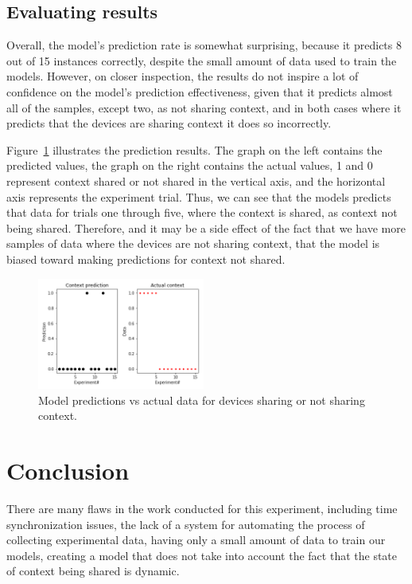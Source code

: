 \documentclass[journal]{IEEEtranTIE}
\begin{document}
\subsection{Evaluating results}

Overall, the model's prediction rate is somewhat surprising, because it predicts
8 out of 15 instances correctly, despite the small amount of data used to train
the models. However, on closer inspection, the results do not inspire a lot of
confidence on the model's prediction effectiveness, given that it predicts
almost all of the samples, except two, as not sharing context, and in both cases
where it predicts that the devices are sharing context it does so incorrectly.

Figure~\ref{fig:model_eval} illustrates the prediction results. The graph on the
left contains the predicted values, the graph on the right contains the actual
values, 1 and 0 represent context shared or not shared in the vertical axis, and
the horizontal axis represents the experiment trial. Thus, we can see that the
models predicts that data for trials one through five, where the context is
shared, as context not being shared. Therefore, and it may be a side effect of
the fact that we have more samples of data where the devices are not sharing
context, that the model is biased toward making predictions for context not
shared.

\begin{figure}[!t]\centering
	\includegraphics[width=5.5cm]{prediction_vs_actual}
	\caption{Model predictions vs actual data for devices sharing or not sharing
             context.}\label{fig:model_eval}
\end{figure}

\section{Conclusion}

There are many flaws in the work conducted for this experiment, including time
synchronization issues, the lack of a system for automating the process of
collecting experimental data, having only a small amount of data to train our
models, creating a model that does not take into account the fact that the state
of context being shared is dynamic.
\end{document}
